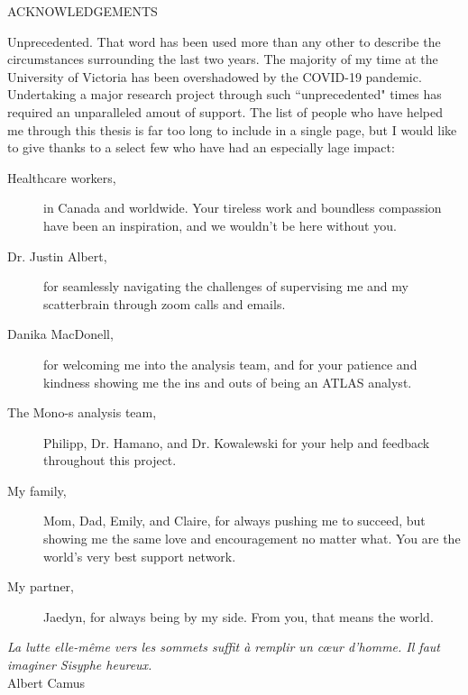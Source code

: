 \newpage
{}

\begin{center}
ACKNOWLEDGEMENTS
\end{center}
%
\noindent

Unprecedented. That word has been used more than any other to describe the circumstances surrounding the last two years. The majority of my time at the University of Victoria has been overshadowed by the COVID-19 pandemic. Undertaking a major research project through such ``unprecedented" times has required an unparalleled amout of support. The list of people who have helped me through this thesis is far too long to include in a single page, but I would like to give thanks to a select few who have had an especially lage impact:
\begin{description}
\item[Healthcare workers,]
  in Canada and worldwide. Your tireless work and boundless compassion have been an inspiration, and we wouldn't be here without you.
\item[Dr. Justin Albert,]
  for seamlessly navigating the challenges of supervising me and my scatterbrain through zoom calls and emails.
\item[Danika MacDonell,]
  for welcoming me into the analysis team, and for your patience and kindness showing me the ins and outs of being an ATLAS analyst.
\item[The Mono-s analysis team,]
  Philipp, Dr. Hamano, and Dr. Kowalewski for your help and feedback throughout this project.
\item[My family,]
  Mom, Dad, Emily, and Claire, for always pushing me to succeed, but showing me the same love and encouragement no matter what. You are the world's very best support network.
\item[My partner,]
	Jaedyn, for always being by my side. From you, that means the world.
\end{description}
%
\begin{flushright}
\textit{La  lutte  elle-même  vers  les  sommets suffit à remplir un cœur d'homme. Il faut imaginer Sisyphe heureux.}
\\
Albert Camus \\
\end{flushright}

